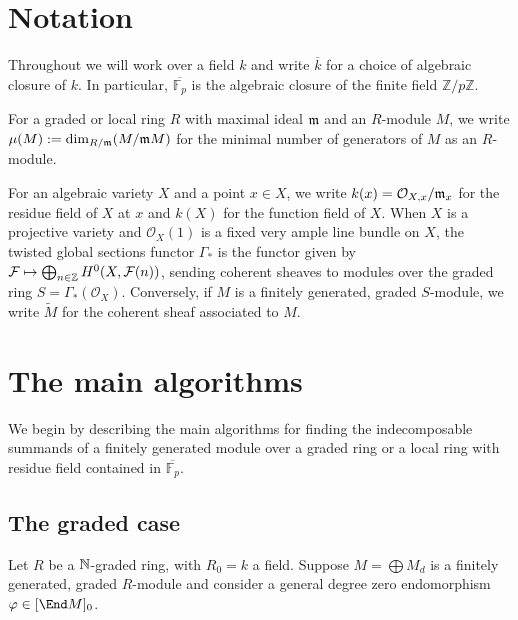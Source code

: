 \documentclass[12pt]{article}
\let\wtilde\widetilde
\def\cF{\mathcal F}
\def\OO{\mathcal O}
\def\FF{\mathbb F}
\def\ZZ{\mathbb Z}
\theoremstyle{theorem}
\numberwithin{thm}{section}
\theoremstyle{definition}
\newcommand{\mahrud}[1]{{\color{ForestGreen} \sf $\blacklozenge$ Mahrud: [#1]}}
\begin{document}
\section{Notation}

Throughout we will work over a field $k$ and write $\overline k$ for a choice of algebraic closure of $k$. \linebreak In particular, $\overline{\FF_p}$ is the algebraic closure of the finite field $\ZZ/p\ZZ$.

For a graded or local ring $R$ with maximal ideal $\mathfrak m$ and an $R$-module $M$, we write $\mu(M):=\dim_{R/\mathfrak m}(M/\mathfrak m M)$ for the minimal number of generators of $M$ as an $R$-module.

For an algebraic variety $X$ and a point $x\in X$, we write $k(x)=\OO_{X,x}/\m_x$ for the residue field of $X$ at $x$ and $k(X)$ for the function field of $X$.
%
When $X$ is a projective variety and $\OO_X(1)$ is a fixed very ample line bundle on $X$, the twisted global sections functor $\Gamma_*$ is the functor given by $\cF \mapsto \bigoplus_{n\in \Z} H^0(X, \cF(n))$, sending coherent sheaves to modules over the graded ring $S = \Gamma_*(\OO_X)$. Conversely, if $M$ is a finitely generated, graded $S$-module, we write $\wtilde M$ for the coherent sheaf associated to $M$.

\section{The main algorithms}

We begin by describing the main algorithms for finding the indecomposable summands of a finitely generated module over a graded ring or a local ring with residue field contained in $\overline{\FF_p}$.

\subsection{The graded case}\label{sec:graded-alg}

Let $R$ be a $\mathbb N$-graded ring, with $R_0 = k$ a field.
Suppose $M = \bigoplus M_d$ is a finitely generated, graded $R$-module and consider a general degree zero endomorphism $\phi \in [\End M]_0$.
\end{document}
